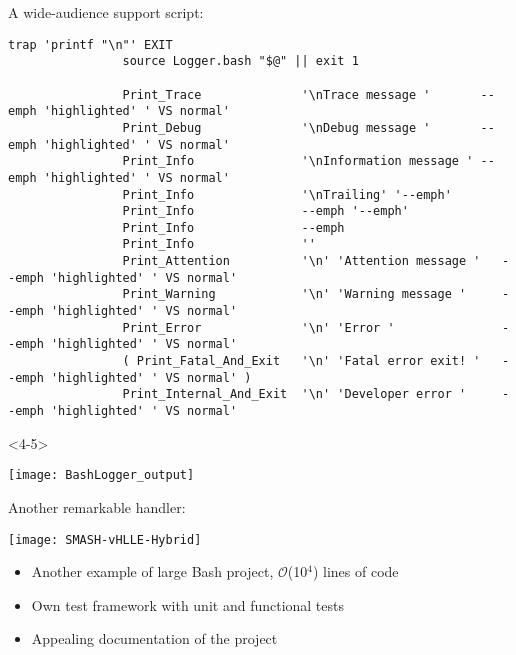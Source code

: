 \begin{frame}[fragile]{A wide-audience support script: }
\begin{overlayarea}{\textwidth}{0.8\textheight}
\begin{onlyenv}
\begin{lstlisting}[style=myBash, aboveskip=0mm, numbers=none, style=smaller, xleftmargin=0mm, xrightmargin=0mm]
                trap 'printf "\n"' EXIT
                source Logger.bash "$@" || exit 1

                Print_Trace              '\nTrace message '       --emph 'highlighted' ' VS normal'
                Print_Debug              '\nDebug message '       --emph 'highlighted' ' VS normal'
                Print_Info               '\nInformation message ' --emph 'highlighted' ' VS normal'
                Print_Info               '\nTrailing' '--emph'
                Print_Info               --emph '--emph'
                Print_Info               --emph
                Print_Info               ''
                Print_Attention          '\n' 'Attention message '   --emph 'highlighted' ' VS normal'
                Print_Warning            '\n' 'Warning message '     --emph 'highlighted' ' VS normal'
                Print_Error              '\n' 'Error '               --emph 'highlighted' ' VS normal'
                ( Print_Fatal_And_Exit   '\n' 'Fatal error exit! '   --emph 'highlighted' ' VS normal' )
                Print_Internal_And_Exit  '\n' 'Developer error '     --emph 'highlighted' ' VS normal'
            \end{lstlisting}
        \end{onlyenv}
        \begin{onlyenv}<4-5>
            \vspace{-4mm}
            \begin{center}
                \texttt{[image: BashLogger\_output]}\\[-1pt]
            \end{center}
        \end{onlyenv}
    \end{overlayarea}
\end{frame}
\begin{frame}[fragile]{Another remarkable handler: }
    \begin{center}
        \texttt{[image: SMASH-vHLLE-Hybrid]}
    \end{center}
    \begin{itemize}
        \item Another example of large Bash project, $\mathcal{O}$(10$^\text{4}$) lines of code
        \item Own test framework with unit and functional tests
        \item Appealing documentation of the project
    \end{itemize}
\end{frame}
